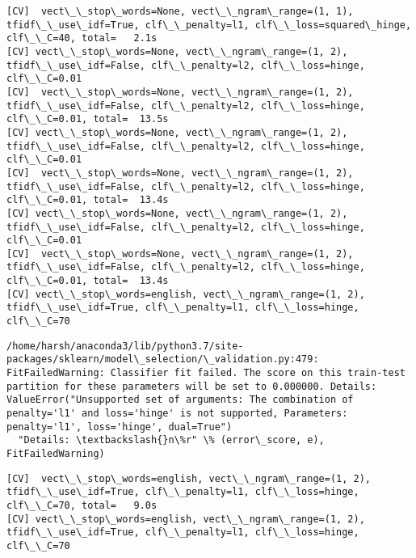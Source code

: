 \documentclass[11pt]{article}
\begin{document}
    \begin{Verbatim}[commandchars=\\\{\}]
[CV]  vect\_\_stop\_words=None, vect\_\_ngram\_range=(1, 1), tfidf\_\_use\_idf=True, clf\_\_penalty=l1, clf\_\_loss=squared\_hinge, clf\_\_C=40, total=   2.1s
[CV] vect\_\_stop\_words=None, vect\_\_ngram\_range=(1, 2), tfidf\_\_use\_idf=False, clf\_\_penalty=l2, clf\_\_loss=hinge, clf\_\_C=0.01 
[CV]  vect\_\_stop\_words=None, vect\_\_ngram\_range=(1, 2), tfidf\_\_use\_idf=False, clf\_\_penalty=l2, clf\_\_loss=hinge, clf\_\_C=0.01, total=  13.5s
[CV] vect\_\_stop\_words=None, vect\_\_ngram\_range=(1, 2), tfidf\_\_use\_idf=False, clf\_\_penalty=l2, clf\_\_loss=hinge, clf\_\_C=0.01 
[CV]  vect\_\_stop\_words=None, vect\_\_ngram\_range=(1, 2), tfidf\_\_use\_idf=False, clf\_\_penalty=l2, clf\_\_loss=hinge, clf\_\_C=0.01, total=  13.4s
[CV] vect\_\_stop\_words=None, vect\_\_ngram\_range=(1, 2), tfidf\_\_use\_idf=False, clf\_\_penalty=l2, clf\_\_loss=hinge, clf\_\_C=0.01 
[CV]  vect\_\_stop\_words=None, vect\_\_ngram\_range=(1, 2), tfidf\_\_use\_idf=False, clf\_\_penalty=l2, clf\_\_loss=hinge, clf\_\_C=0.01, total=  13.4s
[CV] vect\_\_stop\_words=english, vect\_\_ngram\_range=(1, 2), tfidf\_\_use\_idf=True, clf\_\_penalty=l1, clf\_\_loss=hinge, clf\_\_C=70 

    \end{Verbatim}

    \begin{Verbatim}[commandchars=\\\{\}]
/home/harsh/anaconda3/lib/python3.7/site-packages/sklearn/model\_selection/\_validation.py:479: FitFailedWarning: Classifier fit failed. The score on this train-test partition for these parameters will be set to 0.000000. Details: 
ValueError("Unsupported set of arguments: The combination of penalty='l1' and loss='hinge' is not supported, Parameters: penalty='l1', loss='hinge', dual=True")
  "Details: \textbackslash{}n\%r" \% (error\_score, e), FitFailedWarning)

    \end{Verbatim}

    \begin{Verbatim}[commandchars=\\\{\}]
[CV]  vect\_\_stop\_words=english, vect\_\_ngram\_range=(1, 2), tfidf\_\_use\_idf=True, clf\_\_penalty=l1, clf\_\_loss=hinge, clf\_\_C=70, total=   9.0s
[CV] vect\_\_stop\_words=english, vect\_\_ngram\_range=(1, 2), tfidf\_\_use\_idf=True, clf\_\_penalty=l1, clf\_\_loss=hinge, clf\_\_C=70 

    \end{Verbatim}
\end{document}

